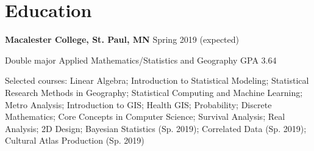 \section{\sc Education}

{\bf Macalester College, St. Paul, MN} \hfill Spring 2019 (expected)\\
\vspace*{-.1in}
\begin{list1}
\item[] Double major Applied Mathematics/Statistics and Geography \hfill GPA 3.64
\vspace*{.05in}
\item[] Selected courses: Linear Algebra; Introduction to Statistical Modeling; Statistical Research Methods in Geography; Statistical Computing and Machine Learning; Metro Analysis; Introduction to GIS; Health GIS; Probability; Discrete Mathematics; Core Concepts in Computer Science; Survival Analysis; Real Analysis; 2D Design; Bayesian Statistics (Sp. 2019); Correlated Data (Sp. 2019); Cultural Atlas Production (Sp. 2019)

\end{list1}

\endinput